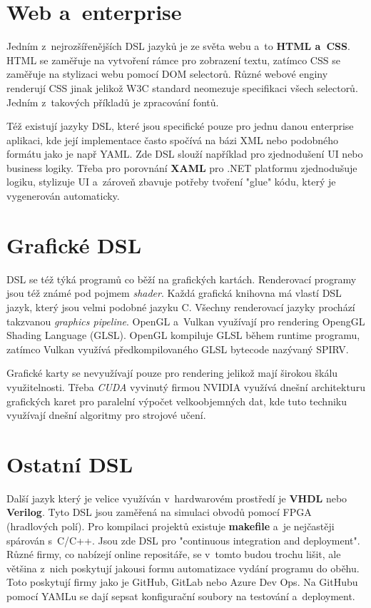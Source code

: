 \documentclass[male, czech]{kithesis}
\begin{document}
\section{Web a~enterprise}
Jedním z~nejrozšířenějších DSL jazyků je ze světa webu a~to \textbf{HTML a~CSS}. 
HTML se zaměřuje na vytvoření rámce pro zobrazení textu,
zatímco CSS se zaměřuje na stylizaci webu pomocí DOM selectorů. 
Různé webové enginy renderují CSS jinak jelikož W3C standard neomezuje specifikaci
všech selectorů.
Jedním z~takových příkladů je zpracování fontů.

Též existují jazyky DSL, 
které jsou specifické pouze pro jednu danou enterprise aplikaci, 
kde její implementace často spočívá na bázi XML nebo podobného formátu jako je např YAML. 
Zde DSL slouží například pro zjednodušení UI nebo business logiky. 
Třeba pro porovnání \textbf{XAML} pro .NET platformu zjednodušuje logiku, 
stylizuje UI a~zároveň zbavuje potřeby tvoření "glue" kódu, 
který je vygenerován automaticky.

\section{Grafické DSL}
DSL se též týká programů co běží na grafických kartách. 
Renderovací programy jsou též známé pod pojmem \textit{shader}.
Každá grafická knihovna má vlastí DSL jazyk, 
který jsou velmi podobné jazyku C.
Všechny renderovací jazyky prochází takzvanou \textit{graphics pipeline}. 
OpenGL a~Vulkan využívají pro rendering OpengGL Shading Language (GLSL). 
OpenGL kompiluje GLSL během runtime programu,
zatímco Vulkan využívá předkompilovaného GLSL bytecode nazývaný SPIRV.

Grafické karty se nevyužívají pouze pro rendering jelikož mají širokou škálu
využitelnosti. 
Třeba \textit{CUDA} vyvinutý firmou NVIDIA 
využívá dnešní architekturu grafických karet pro paralelní výpočet 
velkoobjemných dat, kde tuto techniku využívají dnešní algoritmy pro 
strojové učení. 

\section{Ostatní DSL}
Další jazyk který je velice využíván v~hardwarovém prostředí je \textbf{VHDL} nebo \textbf{Verilog}. 
Tyto DSL jsou zaměřená na simulaci obvodů pomocí FPGA (hradlových polí). 
Pro kompilaci projektů existuje \textbf{makefile} a~je nejčastěji spárován s~C/C++. 
Jsou zde DSL pro "continuous integration and deployment". 
Různé firmy,
co nabízejí online repositáře,
se v~tomto budou trochu lišit, 
ale většina z~nich poskytují jakousi formu automatizace vydání programu do oběhu.
Toto poskytují firmy jako je GitHub,
GitLab nebo Azure Dev Ops. 
Na GitHubu pomocí YAMLu se dají sepsat konfigurační soubory 
na testování a~deployment.
\end{document}
